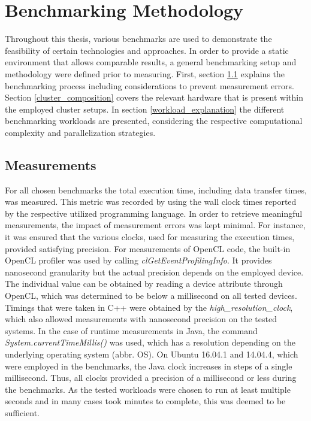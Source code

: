 \chapter{Benchmarking Methodology}
\label{benchmarking_methodology}
Throughout this thesis, various benchmarks are used to demonstrate the feasibility of certain technologies and approaches. In order to provide a static environment that allows comparable results, a general benchmarking setup and methodology were defined prior to measuring. First, section \ref{measurements} explains the benchmarking process including considerations to prevent measurement errors. Section \ref{cluster_composition} covers the relevant hardware that is present within the employed cluster setups. In section \ref{workload_explanation} the different benchmarking workloads are presented, considering the respective computational complexity and parallelization strategies.

\section{Measurements}
\label{measurements}
For all chosen benchmarks the total execution time, including data transfer times, was measured. This metric was recorded by using the wall clock times reported by the respective utilized programming language. In order to retrieve meaningful measurements, the impact of measurement errors was kept minimal. For instance, it was ensured that the various clocks, used for measuring the execution times, provided satisfying precision. For measurements of OpenCL code, the built-in OpenCL profiler was used by calling \textit{clGetEventProfilingInfo}. It provides nanosecond granularity but the actual precision depends on the employed device\cite{cl_profiling}. The individual value can be obtained by reading a device attribute through OpenCL, which was determined to be below a millisecond on all tested devices. Timings that were taken in C++ were obtained by the \textit{high\_resolution\_clock}, which also allowed measurements with nanosecond precision on the tested systems. In the case of runtime measurements in Java, the command \textit{System.currentTimeMillis()} was used, which has a resolution depending on the underlying operating system (abbr. OS)\cite{oracle_system}. On Ubuntu 16.04.1 and 14.04.4, which were employed in the benchmarks, the Java clock increases in steps of a single millisecond. Thus, all clocks provided a precision of a millisecond or less during the benchmarks. As the tested workloads were chosen to run at least multiple seconds and in many cases took minutes to complete, this was deemed to be sufficient.

